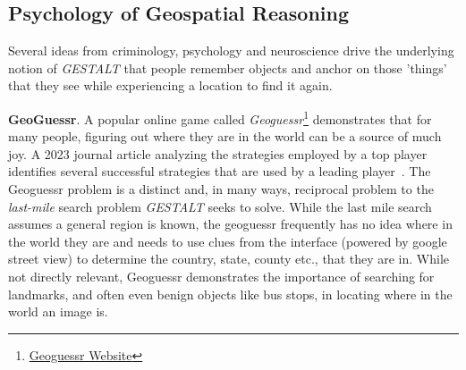

\subsection{Psychology of Geospatial Reasoning}
Several ideas from criminology, psychology and neuroscience drive the underlying notion of \textit{GESTALT} that people remember objects and anchor on those 'things' that they see while experiencing a location to find it again. 

\textbf{GeoGuessr}. A popular online game called \textit{Geoguessr}\footnote{\href{https://www.geoguessr.com/}{Geoguessr Website}} demonstrates that for many people, figuring out where they are in the world can be a source of much joy. 
A 2023 journal article analyzing the strategies employed by a top player identifies several successful strategies that are used by a leading player~\cite{Berners-Lee2023}. 
The Geoguessr problem is a distinct and, in many ways, reciprocal problem to the \textit{last-mile} search problem \textit{GESTALT} seeks to solve. While the last mile search assumes a general region is known, the geoguessr frequently has no idea where in the world they are and needs to use clues from the interface (powered by google street view) to determine the country, state, county etc., that they are in. 
While not directly relevant, Geoguessr demonstrates the importance of searching for landmarks, and often even benign objects like bus stops, in locating where in the world an image is. 

